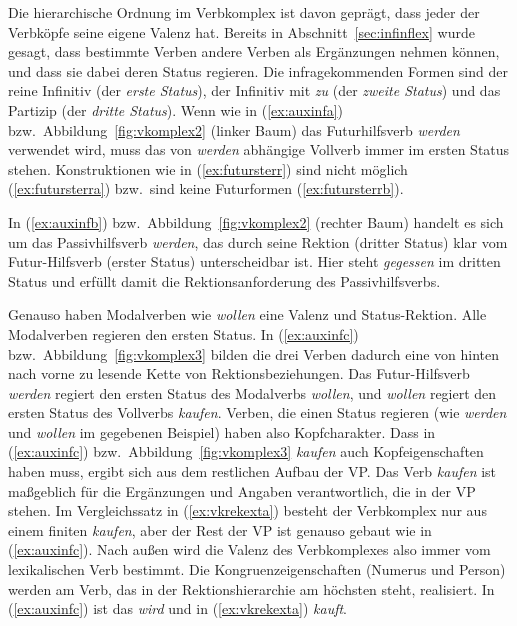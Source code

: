 
Die hierarchische Ordnung im Verbkomplex ist davon geprägt, dass jeder der Verbköpfe seine eigene Valenz hat.
Bereits in Abschnitt~\ref{sec:infinflex} wurde gesagt, dass bestimmte Verben andere Verben als Ergänzungen nehmen können, und dass sie dabei deren Status regieren.
Die infragekommenden Formen sind der reine Infinitiv (der \textit{erste Status}), der Infinitiv mit \textit{zu} (der \textit{zweite Status}) und das Partizip (der \textit{dritte Status}).
Wenn wie in (\ref{ex:auxinfa}) bzw.\ Abbildung~\ref{fig:vkomplex2} (linker Baum) das Futurhilfsverb \textit{werden} verwendet wird, muss das von \textit{werden} abhängige Vollverb immer im ersten Status stehen.
Konstruktionen wie in (\ref{ex:futursterr}) sind nicht möglich (\ref{ex:futursterra}) bzw.\ sind keine Futurformen (\ref{ex:futursterrb}).

\begin{exe}
  \ex\label{ex:futursterr}
  \begin{xlist}
  \end{xlist}
\end{exe}

In (\ref{ex:auxinfb}) bzw.\ Abbildung~\ref{fig:vkomplex2} (rechter Baum) handelt es sich um das Passivhilfsverb \textit{werden}, das durch seine Rektion (dritter Status) klar vom Futur-Hilfsverb (erster Status) unterscheidbar ist.
Hier steht \textit{gegessen} im dritten Status und erfüllt damit die Rektionsanforderung des Passivhilfsverbs.

Genauso haben Modalverben wie \textit{wollen} eine Valenz und Status-Rektion.
Alle Modalverben regieren den ersten Status.
In (\ref{ex:auxinfc}) bzw.\ Abbildung~\ref{fig:vkomplex3} bilden die drei Verben dadurch eine von hinten nach vorne zu lesende Kette von Rektionsbeziehungen.
Das Futur-Hilfsverb \textit{werden} regiert den ersten Status des Modalverbs \textit{wollen}, und \textit{wollen} regiert den ersten Status des Vollverbs \textit{kaufen}.
Verben, die einen Status regieren (wie \textit{werden} und \textit{wollen} im gegebenen Beispiel) haben also Kopfcharakter.
Dass in (\ref{ex:auxinfc}) bzw.\ Abbildung~\ref{fig:vkomplex3} \textit{kaufen} auch Kopfeigenschaften haben muss, ergibt sich aus dem restlichen Aufbau der VP.
Das Verb \textit{kaufen} ist maßgeblich für die Ergänzungen und Angaben verantwortlich, die in der VP stehen.
Im Vergleichssatz in (\ref{ex:vkrekexta}) besteht der Verbkomplex nur aus einem finiten \textit{kaufen}, aber der Rest der VP ist genauso gebaut wie in (\ref{ex:auxinfc}).
Nach außen wird die Valenz des Verbkomplexes also immer vom lexikalischen Verb bestimmt.
Die Kongru\-enz\-ei\-gen\-schaf\-ten (Numerus und Person) werden am Verb, das in der Rektionshierarchie am höchsten steht, realisiert.
In (\ref{ex:auxinfc}) ist das \textit{wird} und in (\ref{ex:vkrekexta}) \textit{kauft}.

